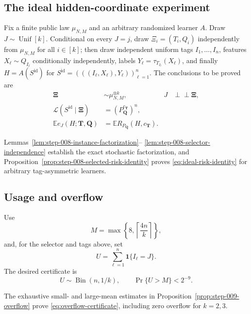 \subsection{The ideal hidden-coordinate experiment}\label{app:step-008}
Fix a finite public law $\mu_{N,M}$ and an arbitrary randomized learner
$A$.  Draw $J\sim\operatorname{Unif}[k]$.  Conditional on every $J=j$,
draw $\Xi_i=(T_i,Q_i)$ independently from $\mu_{N,M}$ for all $i\in[k]$;
then draw independent uniform tags $I_1,\ldots,I_n$, features
$X_\ell\sim Q_{I_\ell}$ conditionally independently, labels
$Y_\ell=\tau_{T_{I_\ell}}(X_\ell)$, and finally
$H=A(S^{\mathrm{id}})$ for
$S^{\mathrm{id}}=(((I_\ell,X_\ell),Y_\ell))_{\ell=1}^n$.
The conclusions to be proved are
\begin{align}
\boldsymbol\Xi&\sim\mu_{N,M}^{\otimes k},
&J&\perp\!\!\!\perp\boldsymbol\Xi,
\tag{2}\label{eq:ideal-instance-law}\\
\mathcal L(S^{\mathrm{id}}\mid\boldsymbol\Xi)
&=(P_{\boldsymbol Q}^{c_{\boldsymbol T}})^n,
\tag{3}\label{eq:ideal-sample-law}\\
\mathbb E e_J(H;\boldsymbol T,\boldsymbol Q)
&=\mathbb E R_{P_{\boldsymbol Q}}(H,c_{\boldsymbol T}).
\tag{4}\label{eq:ideal-risk-identity}
\end{align}

Lemmas~\ref{lem:step-008-instance-factorization}--
\ref{lem:step-008-selector-independence} establish the exact stochastic
factorization, and
Proposition~\ref{prop:step-008-selected-risk-identity} proves
\eqref{eq:ideal-risk-identity} for arbitrary tag-asymmetric learners.

\subsection{Usage and overflow}\label{app:step-009}
Use
\begin{equation}
M=\max\left\{8,\left\lceil\frac{4n}{k}\right\rceil\right\},
\tag{1}\label{eq:overflow-budget}
\end{equation}
and, for the selector and tags above, set
\begin{equation}
U=\sum_{\ell=1}^n\mathbf 1\{I_\ell=J\}.
\tag{2}\label{eq:usage-count}
\end{equation}
The desired certificate is
\begin{equation}
U\sim\operatorname{Bin}(n,1/k),
\qquad \Pr\{U>M\}<2^{-9}.
\tag{3}\label{eq:overflow-certificate}
\end{equation}

The exhaustive small- and large-mean estimates in
Proposition~\ref{prop:step-009-overflow} prove
\eqref{eq:overflow-certificate}, including zero overflow for $k=2,3$.

